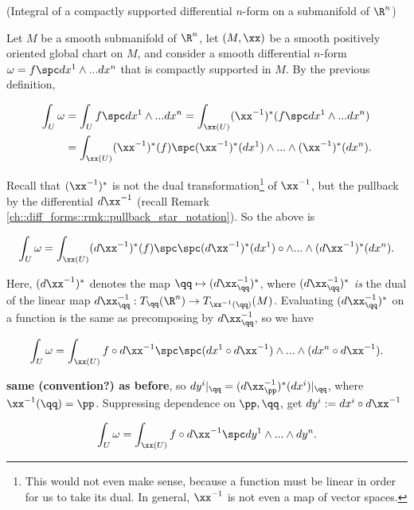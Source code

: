 \begin{theorem}
    (Integral of a compactly supported differential $n$-form on a submanifold of $\R^n$)
    
    Let $M$ be a smooth submanifold of $\R^n$, let $(M, \xx)$ be a smooth positively oriented global chart on $M$, and consider a smooth differential $n$-form $\omega = f \spc dx^1 \wedge ... dx^n$ that is compactly supported in $M$. By the previous definition,
    
    \begin{align*}
        \int_U \omega &= \int_U f \spc dx^1 \wedge ... dx^n  = \int_{\xx(U)} (\xx^{-1})^*(f \spc dx^1 \wedge ... dx^n) \\
        &= \int_{\xx(U)} (\xx^{-1})^*(f) \spc (\xx^{-1})^*(dx^1) \wedge ... \wedge (\xx^{-1})^*(dx^n).
    \end{align*}
    
    Recall that $(\xx^{-1})^*$ is not the dual transformation\footnote{This would not even make sense, because a function must be linear in order for us to take its dual. In general, $\xx^{-1}$ is not even a map of vector spaces.} of $\xx^{-1}$, but the pullback by the differential $d \xx^{-1}$ (recall Remark \ref{ch::diff_forms::rmk::pullback_star_notation}). So the above is
    
    \begin{align*}
        \int_U \omega = \int_{\xx(U)} (d \xx^{-1})^*(f) \spc \spc (d \xx^{-1})^*(dx^1) \circ  \wedge ... \wedge (d \xx^{-1})^*(dx^n).
    \end{align*}
    
    Here, $(d\xx^{-1})^*$ denotes the map $\qq \mapsto (d\xx^{-1}_\qq)^*$, where $(d\xx^{-1}_\qq)^*$ \textit{is} the dual of the linear map $d\xx^{-1}_\qq:T_\qq(\R^n) \rightarrow T_{\xx^{-1}(\qq)}(M)$. Evaluating $(d\xx^{-1}_\qq)^*$ on a function is the same as precomposing by $d\xx^{-1}_\qq$, so we have
    
    \begin{align*}
        \int_U \omega = \int_{\xx(U)} f \circ d \xx^{-1} \spc \spc (dx^1 \circ d \xx^{-1}) \wedge ... \wedge (dx^n \circ d \xx^{-1}).
    \end{align*}
    
    \textbf{same (convention?) as before}, so $dy^i|_\qq = (d\xx^{-1}_\pp)^*(dx^i)|_\qq$, where $\xx^{-1}(\qq) = \pp$. Suppressing dependence on $\pp, \qq$, get $dy^i := dx^i \circ d\xx^{-1}$
    
    \begin{align*}
        \int_U \omega = \int_{\xx(U)} f \circ d \xx^{-1} \spc dy^1 \wedge ... \wedge dy^n.
    \end{align*}
    

\end{theorem}
